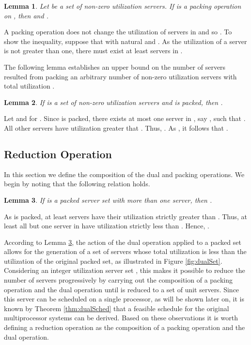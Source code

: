 \documentclass[twocolumn, compsocconf]{IEEEtran}
\newtheorem{lemma}{Lemma}[section]
\newcounter{proc}
\begin{document}
\begin{lemma}\label{lem:packMap}
  Let  be a set of non-zero utilization servers. If  is a
  packing operation on , then  and .
\end{lemma}

\begin{IEEEproof}
  A packing operation does not change the utilization of servers in 
  and so . To show the inequality,
  suppose that  with  natural and . As the utilization of a server is not greater than one, there
  must exist at least  servers in .
\end{IEEEproof}

The following lemma establishes an upper bound on the number of servers resulted
from packing an arbitrary number of non-zero utilization servers with total
utilization .

\begin{lemma}\label{lem:packReduc}
  If  is a set of non-zero utilization servers and  is
  packed, then .
\end{lemma}

\begin{IEEEproof}
  Let  and  for .  Since
   is packed, there exists at most one server in , say
  , such that . All other servers have utilization greater that
  .  Thus, . As , it
  follows that .
\end{IEEEproof}


\subsection{Reduction Operation}
\label{sec:dualPackingSched}

In this section we define the composition of the dual and packing operations. We
begin by noting that the following relation holds.

\begin{lemma}\label{lem:dualUtil}
  If  is a packed server set with more than one server, then
  .
\end{lemma}

\begin{IEEEproof}
  As  is packed, at least  servers have their
  utilization strictly greater than . Thus, at least all but one server in
   have utilization strictly less than
  . Hence, .
\end{IEEEproof}

According to Lemma \ref{lem:dualUtil}, the action of the dual operation applied
to a packed set allows for the generation of a set of servers whose total
utilization is less than the utilization of the original packed set, as
illustrated in Figure \ref{fig:dualSet}. Considering an integer utilization
server set , this makes it possible to reduce the number of servers
progressively by carrying out the composition of a packing operation and the
dual operation until  is reduced to a set of unit servers. Since this
server can be scheduled on a single processor, as will be shown later on, it is
known by Theorem \ref{thm:dualSched} that a feasible schedule for the original
multiprocessor systems can be derived. Based on these observations it is worth
defining a reduction operation as the composition of a packing operation and the
dual operation.
\end{document}
